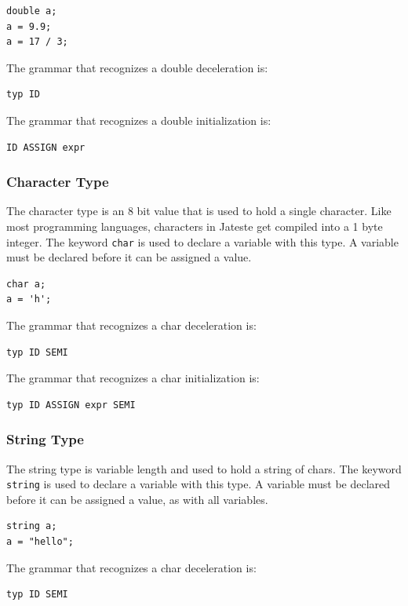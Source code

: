 \documentclass{article}
\begin{document}
\begin{lstlisting}
double a;
a = 9.9;
a = 17 / 3;
\end{lstlisting}

The grammar that recognizes a double deceleration is: 
\begin{Verbatim}[frame=single]
typ ID
\end{Verbatim}

The grammar that recognizes a double initialization is: 
\begin{Verbatim}[frame=single]
ID ASSIGN expr
\end{Verbatim}

\subsubsection{Character Type}
The character type is an 8 bit value that is used to hold a single character. Like most programming languages, characters in Jateste get compiled into a 1 byte integer. The keyword \texttt{char} is used to declare a variable with this type.  A variable must be declared before it can be assigned a value.
\begin{lstlisting}
char a;
a = 'h';
\end{lstlisting}

The grammar that recognizes a char deceleration is: 
\begin{Verbatim}[frame=single]
typ ID SEMI
\end{Verbatim}

The grammar that recognizes a char initialization is: 
\begin{Verbatim}[frame=single]
typ ID ASSIGN expr SEMI
\end{Verbatim}

\subsubsection{String Type}
The string type is variable length and used to hold a string of chars.  The keyword \texttt{string} is used to declare a variable with this type.  A variable must be declared before it can be assigned a value, as with all variables.
\begin{lstlisting}
string a;
a = "hello";
\end{lstlisting}

The grammar that recognizes a char deceleration is: 
\begin{Verbatim}[frame=single]
typ ID SEMI
\end{Verbatim}
\end{document}
